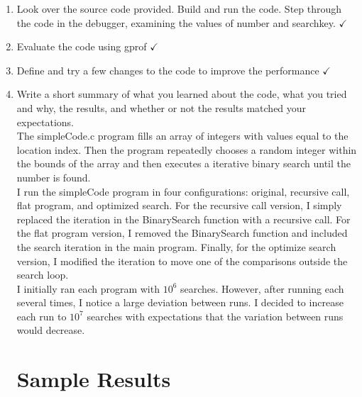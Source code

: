 \documentclass[11pt]{article}
\begin{document}
\begin{enumerate}
\item Look over the source code provided. Build and run the code. Step through the code in the debugger, examining the values of number and searchkey. $\checkmark$ 
\item Evaluate the code using gprof $\checkmark$ 

\item Define and try a few changes to the code to improve the performance $\checkmark$ 
\item Write a short summary of what you learned about the code, what you tried and why, the results, and whether or not the results matched your expectations.\\

The simpleCode.c program fills an array of integers with values equal to the location index. Then the program repeatedly chooses a random integer within the bounds of the array and then executes a iterative binary search until the number is found.\\

I run the simpleCode program in four configurations: original, recursive call, flat program, and optimized search.  For the recursive call version, I simply replaced the iteration in the BinarySearch function with a recursive call.  For the flat program version, I removed the BinarySearch function and included the search iteration in the main program. Finally, for the optimize search version, I modified the iteration to move one of the comparisons outside the search loop.\\

I initially ran each program with $10^6$ searches.  However, after running each several times, I notice a large deviation between runs.  I decided to increase each run to $10^7$ searches with expectations that the variation between runs would decrease.\\


\section*{Sample Results}

\end{enumerate}
\end{document}
